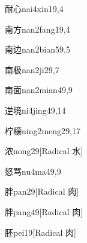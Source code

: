 \begin{verbete}{耐心}{nai4xin1}{9,4}
\end{verbete}

\begin{verbete}{南方}{nan2fang1}{9,4}
\end{verbete}

\begin{verbete}{南边}{nan2bian5}{9,5}
\end{verbete}

\begin{verbete}{南极}{nan2ji2}{9,7}
\end{verbete}

\begin{verbete}{南面}{nan2mian4}{9,9}
\end{verbete}

\begin{verbete}{逆境}{ni4jing4}{9,14}
\end{verbete}

\begin{verbete}{柠檬}{ning2meng2}{9,17}
\end{verbete}

\begin{verbete}{浓}{nong2}{9}[Radical 水]
\end{verbete}

\begin{verbete}{怒骂}{nu4ma4}{9,9}
\end{verbete}

\begin{verbete}{胖}{pan2}{9}[Radical 肉]
\end{verbete}

\begin{verbete}{胖}{pang4}{9}[Radical 肉]
\end{verbete}

\begin{verbete}{胚}{pei1}{9}[Radical 肉]
\end{verbete}

